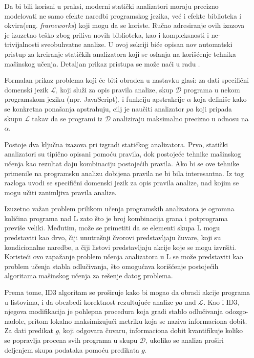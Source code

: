 \documentclass[a4paper]{article}
\theoremstyle{definition}
\begin{document}
{%
Da bi bili korisni u praksi, moderni statički analizatori moraju precizno 
modelovati ne samo efekte naredbi programskog jezika, već i efekte biblioteka 
i okvira(eng. \emph{frameworks}) koji mogu da se koriste. Ručno adresiranje ovih izazova 
je izuzetno teško zbog priliva novih biblioteka, kao i kompleksnosti i 
ne-trivijalnosti sveobuhvatne analize. U ovoj sekciji biće opisan nov 
automatski pristup za kreiranje statičkih analizatora koji se oslanja na 
korišćenje tehnika mašinskog učenja. Detaljan prikaz pristupa se može naći 
u radu \cite{staticAnalyzer}.

Formalan prikaz problema koji će biti obrađen u nastavku glasi: za dati 
specifični domenski jezik $\mathcal{L}$, koji služi za opis pravila analize, 
skup $\mathcal{D}$ programa u nekom programskom jeziku (npr. JavaScript), i 
funkciju apstrakcije $\alpha$ koja definiše kako se konkretna ponašanja 
apstrahuju, cilj je naučiti analizator $pa$ koji pripada skupu $\mathcal{L}$ 
takav da se programi iz $\mathcal{D}$ analiziraju maksimalno precizno u odnosu 
na $\alpha$.


Postoje dva ključna izazova pri izgradi statičkog analizatora. Prvo, statički 
analizatori su tipično opisani pomoću pravila, dok postojeće tehnike mašinskog 
učenja kao rezultat daju kombinaciju postojećih pravila. Ako bi se ove tehnike 
primenile na programsku analizu \cite{predictingProgramProperties} dobijena 
pravila ne bi bila interesantna. Iz tog razloga uvodi se specifični domenski 
jezik za opis pravila analize, nad kojim se mogu učiti zanimljiva pravila analize.


Izuzetno važan problem prilikom učenja programskih analizatora je ogromna količina 
programa nad L zato što je broj kombinacija grana i potprograma previše veliki. 
Međutim, može se primetiti da se elementi skupa L mogu predstaviti kao drvo, čiji 
unutrašnji čvorovi predstavljaju čuvare, koji su kondicionalne naredbe, a čiji 
listovi predstavljaju akcije koje se mogu izvršiti. Koristeći ovo zapažanje problem 
učenja analizatora u L se može predstaviti kao problem učenja stabla odlučivanja, 
što omogućava korišćenje postojećih algoritama mašinskog učenja za 
rešenje datog problema.

Prema tome, ID3 \cite{id3} algoritam se proširuje kako bi mogao da obradi akcije 
programa u listovima, i da obezbedi korektnost rezultujuće analize $pa$ nad 
$\mathcal{L}$. Kao i ID3, njegova modifikacija je pohlepna procedura koja gradi 
stablo odlučivanja odozgo-nadole, pritom lokalno maksimizujući metriku koja se 
naziva informaciona dobit. Za dati predikat $g$, koji odgovara čuvaru, 
informaciona dobit kvantifikuje koliko se popravlja procena svih programa u 
skupu $\mathcal{D}$, ukoliko se analiza proširi deljenjem skupa podataka 
pomoću predikata $g$.


}
\end{document}
